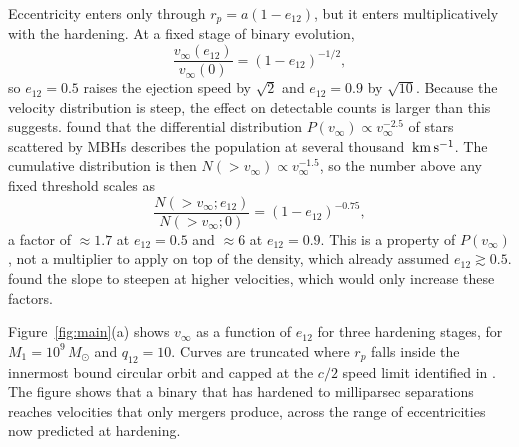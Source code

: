 \documentclass[twocolumn]{aastex701}
\newcommand{\vinf}{v_{\infty}}
\newcommand{\kms}{\,{\rm km\,s^{-1}}}
\newcommand{\Msun}{\,M_{\odot}}
\begin{document}
Eccentricity enters only through $r_{p}=a(1-e_{12})$, but it enters
multiplicatively with the hardening. At a fixed stage of binary evolution,
\begin{equation}
\frac{\vinf(e_{12})}{\vinf(0)} = (1-e_{12})^{-1/2},
\label{eq:eboost}
\end{equation}
so $e_{12}=0.5$ raises the ejection speed by $\sqrt{2}$ and $e_{12}=0.9$ by
$\sqrt{10}$. Because the velocity distribution is steep, the effect on
detectable counts is larger than this suggests.  found that the
differential distribution $P(\vinf)\propto \vinf^{-2.5}$ of stars scattered by
MBHs \citep{sesana07,sherwin08} describes the population at several thousand
$\kms$. The cumulative distribution is then $N(>\vinf)\propto \vinf^{-1.5}$, so
the number above any fixed threshold scales as
\begin{equation}
\frac{N(>\vinf;e_{12})}{N(>\vinf;0)}=(1-e_{12})^{-0.75},
\label{eq:nboost}
\end{equation}
a factor of $\approx1.7$ at $e_{12}=0.5$ and $\approx6$ at $e_{12}=0.9$.
This is a property of $P(\vinf)$, not a multiplier to apply on top of the
 density, which already assumed $e_{12}\gtrsim0.5$.
 found the slope to steepen at
higher velocities, which would only increase these factors.

Figure~\ref{fig:main}(a) shows $\vinf$ as a function of $e_{12}$ for three
hardening stages, for $M_{1}=10^{9}\Msun$ and $q_{12}=10$. Curves are truncated
where $r_{p}$ falls inside the innermost bound circular orbit
\citep{bardeen72} and capped at the $c/2$ speed limit identified in
. The figure shows that a binary
that has hardened to milliparsec separations reaches velocities
that only mergers produce, across the range of eccentricities now predicted
at hardening.
\end{document}

